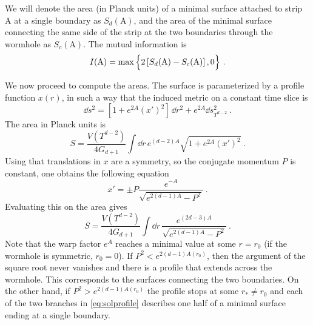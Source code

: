 We will denote the area (in Planck units) of a minimal surface attached to strip A at a single boundary as $S_d(\text{A})$, and the area of the minimal surface connecting the same side of the strip at the two boundaries through the wormhole as $S_c(\text{A})$. The mutual information is
\begin{equation}
	I(\text{A})={\rm max}\,\Big\{2 \left[S_d(\text{A})-S_c(\text{A})\right],0\Big\}\ .
\end{equation}

We now proceed to compute the areas. The surface is parameterized by a profile function $x(r)$, in such a way that the induced metric on a constant time slice is
\begin{equation}
	\dd s^2
	=
	\left[1+e^{2A}(x')^2\right]\, \dd r^2+e^{2A}\dd s^2_{T^{d-2}}\ .
\end{equation}
The area in Planck units is
\begin{equation}
	S=\frac{V(T^{d-2})}{4 G_{d+1}}\int \dd r\, e^{(d-2)A}\sqrt{1+e^{2A}(x')^2}\ .
\end{equation}
Using that translations in $x$ are a symmetry, so the conjugate momentum $P$ is constant, one obtains the following equation
\begin{equation}\label{eq:solprofile}
	x'=\pm P\frac{e^{-A}}{\sqrt{e^{2(d-1)A}-P^2}}\ .
\end{equation}
Evaluating this on the area gives
\begin{equation}
S= \frac{V(T^{d-2})}{4 G_{d+1}}\int \dd r\, \frac{e^{(2d-3)A}}{\sqrt{e^{2(d-1)A}-P^2}}\ .
\end{equation}
Note that the warp factor $e^A$ reaches a minimal value at some $r=r_0$ (if the wormhole is symmetric, $r_0=0$). If $P^2< e^{2(d-1)A(r_0)}$, then the argument of the square root never vanishes and there is a profile that extends across the wormhole. This corresponds to the surfaces connecting the two boundaries. On the other hand, if $P^2> e^{2(d-1)A(r_0)}$ the profile stops at some $r_*\neq r_0$ and each of the two branches in \eqref{eq:solprofile} describes one half of a minimal surface ending at a single boundary.

